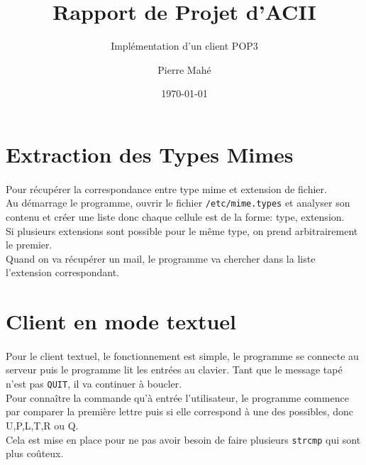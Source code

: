 \documentclass[a4paper, titlepage, oneside, 12pt]{article}%
\title{Rapport de Projet d'ACII}
\subtitle{Implémentation d'un client POP3}
\author{Pierre Mahé}
\date{\today}
\begin{document}
 
\maketitle 

\newpage

\section{Extraction des Types Mimes}
\paragraph{}
Pour récupérer la correspondance entre type mime et extension de fichier.\\
Au démarrage le programme, ouvrir le fichier \texttt{/etc/mime.types} et analyser son contenu et créer une liste donc chaque cellule est de la forme: type, extension.\\
Si plusieurs extensions sont possible pour le même type, on prend arbitrairement le premier.\\
Quand on va récupérer un mail, le programme va chercher dans la liste l'extension correspondant.

\section{Client en mode textuel}
\paragraph{}
Pour le client textuel, le fonctionnement est simple, le programme se connecte au serveur puis le programme lit les entrées au clavier.
Tant que le message tapé n'est pas \texttt{QUIT}, il va continuer à boucler.\\
Pour connaître la commande qu'à entrée l'utilisateur, le programme commence par comparer la première lettre puis si elle correspond à une des possibles, donc U,P,L,T,R ou Q.\\
Cela est mise en place pour ne pas avoir besoin de faire plusieurs \texttt{strcmp} qui sont plus coûteux.
\end{document}
